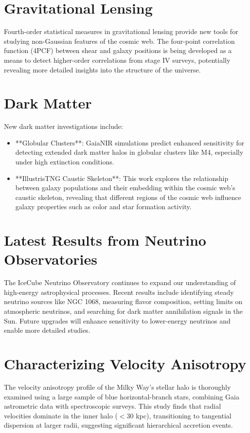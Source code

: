 \documentclass[11pt]{article}
\begin{document}
\section*{Gravitational Lensing}
Fourth-order statistical measures in gravitational lensing provide new tools for studying non-Gaussian features of the cosmic web. The four-point correlation function (4PCF) between shear and galaxy positions is being developed as a means to detect higher-order correlations from stage IV surveys, potentially revealing more detailed insights into the structure of the universe.
\section*{Dark Matter}
New dark matter investigations include:
\begin{itemize}
\item **Globular Clusters**: GaiaNIR simulations predict enhanced sensitivity for detecting extended dark matter halos in globular clusters like M4, especially under high extinction conditions.
\item **IllustrisTNG Caustic Skeleton**: This work explores the relationship between galaxy populations and their embedding within the cosmic web's caustic skeleton, revealing that different regions of the cosmic web influence galaxy properties such as color and star formation activity.
\end{itemize}
\section*{Latest Results from Neutrino Observatories}
The IceCube Neutrino Observatory continues to expand our understanding of high-energy astrophysical processes. Recent results include identifying steady neutrino sources like NGC 1068, measuring flavor composition, setting limits on atmospheric neutrinos, and searching for dark matter annihilation signals in the Sun. Future upgrades will enhance sensitivity to lower-energy neutrinos and enable more detailed studies.
\section*{Characterizing Velocity Anisotropy}
The velocity anisotropy profile of the Milky Way's stellar halo is thoroughly examined using a large sample of blue horizontal-branch stars, combining Gaia astrometric data with spectroscopic surveys. This study finds that radial velocities dominate in the inner halo (\(< 30\) kpc), transitioning to tangential dispersion at larger radii, suggesting significant hierarchical accretion events.
\end{document}
